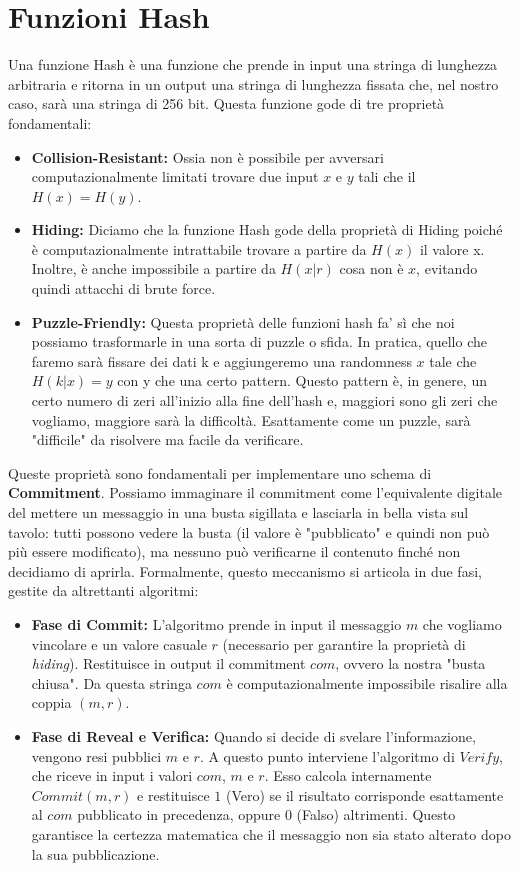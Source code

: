 \chapter{Funzioni Hash}
Una funzione Hash è una funzione che prende in input una stringa di lunghezza arbitraria e ritorna in un output una stringa di lunghezza fissata che, nel nostro caso, sarà una stringa di 256 bit. Questa funzione gode di tre proprietà fondamentali:
\begin{itemize}
    \item \textbf{Collision-Resistant:} Ossia non è possibile per avversari computazionalmente limitati trovare due input $x$ e $y$ tali che il $H(x) = H(y)$.
    \item \textbf{Hiding:} Diciamo che la funzione Hash gode della proprietà di Hiding poiché è computazionalmente intrattabile trovare a partire da $H(x)$ il valore x. Inoltre, è anche impossibile a partire da $H(x|r)$ cosa non è $x$, evitando quindi attacchi di brute force. 
    \item \textbf{Puzzle-Friendly:} Questa proprietà delle funzioni hash fa' sì che noi possiamo trasformarle in una sorta di puzzle o sfida. In pratica, quello che faremo sarà fissare dei dati k e aggiungeremo una randomness $x$ tale che $H(k|x) = y$ con y che una certo pattern. Questo pattern è, in genere, un certo numero di zeri all'inizio alla fine dell'hash e, maggiori sono gli zeri che vogliamo, maggiore sarà la difficoltà. Esattamente come un puzzle, sarà "difficile" da risolvere ma facile da verificare.
\end{itemize}
Queste proprietà sono fondamentali per implementare uno schema di \textbf{Commitment}. Possiamo immaginare il commitment come l'equivalente digitale del mettere un messaggio in una busta sigillata e lasciarla in bella vista sul tavolo: tutti possono vedere la busta (il valore è "pubblicato" e quindi non può più essere modificato), ma nessuno può verificarne il contenuto finché non decidiamo di aprirla. Formalmente, questo meccanismo si articola in due fasi, gestite da altrettanti algoritmi:
\begin{itemize}
    \item \textbf{Fase di Commit:} L'algoritmo prende in input il messaggio $m$ che vogliamo vincolare e un valore casuale $r$ (necessario per garantire la proprietà di \textit{hiding}). Restituisce in output il commitment $com$, ovvero la nostra "busta chiusa". Da questa stringa $com$ è computazionalmente impossibile risalire alla coppia $(m, r)$.
    \item \textbf{Fase di Reveal e Verifica:} Quando si decide di svelare l'informazione, vengono resi pubblici $m$ e $r$. A questo punto interviene l'algoritmo di $Verify$, che riceve in input i valori $com$, $m$ e $r$. Esso calcola internamente $Commit(m, r)$ e restituisce $1$ (Vero) se il risultato corrisponde esattamente al $com$ pubblicato in precedenza, oppure $0$ (Falso) altrimenti. Questo garantisce la certezza matematica che il messaggio non sia stato alterato dopo la sua pubblicazione.
\end{itemize}

